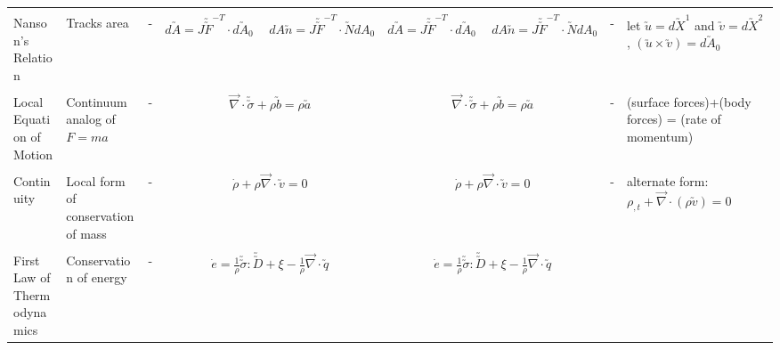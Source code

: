 \documentclass[10pt]{article}
\begin{document}
\begin{center}
\begin{tabular}{l m{3in} c c c c m{5in}}
\\[1ex]
\hline
\\[-1ex]
Nanson's Relation
&%
Tracks area
&%
-
&%
$ d\utilde{A} = J \utilde{\utilde{F}}^{-T}\cdot d\utilde{A}_{0} \hspace{15pt} dA\utilde{n}=J \utilde{\utilde{F}}^{-T}\cdot\utilde{N} dA_{0}$
&%
$ d\utilde{A} = J \utilde{\utilde{F}}^{-T}\cdot d\utilde{A}_{0} \hspace{15pt} dA\utilde{n}=J \utilde{\utilde{F}}^{-T}\cdot\utilde{N} dA_{0}$
&%
-
&%
let $\utilde{u} = d\utilde{X}^{1}$ and $\utilde{v}=d\utilde{X}^{2}$, $(\utilde{u}\times\utilde{v})=d\utilde{A}_{0}$
\\[1ex]
\hline
\\[-1ex]
Local Equation of Motion
&%
Continuum analog of $F=ma$
&%
-
&%
$ \overrightarrow{\nabla}\cdot\utilde{\utilde{\sigma}}+\rho\utilde{b}=\rho\utilde{a}$
&%
$ \overrightarrow{\nabla}\cdot\utilde{\utilde{\sigma}}+\rho\utilde{b}=\rho\utilde{a}$
&%
-
&%
(surface forces)+(body forces) = (rate of momentum)
\\[1ex]
\hline
\\[-1ex]
Continuity
&%
Local form of conservation of mass
&%
-
&%
$ \dot{\rho}+\rho\overrightarrow{\nabla}\cdot\utilde{v}=0 $
&%
$ \dot{\rho}+\rho\overrightarrow{\nabla}\cdot\utilde{v}=0 $
&%
-
&%
alternate form: $\rho_{,t}+\overrightarrow{\nabla}\cdot(\rho\utilde{v})=0$
\\[1ex]
\hline
\\[-1ex]
First Law of Thermodynamics
&%
Conservation of energy
&%
-
&%
$\dot{e}=\frac{1}{\rho}\utilde{\utilde{\sigma}}:\utilde{\utilde{D}}+\xi-\frac{1}{\rho}\overrightarrow{\nabla}\cdot\utilde{q}$
&%
$\dot{e}=\frac{1}{\rho}\utilde{\utilde{\sigma}}:\utilde{\utilde{D}}+\xi-\frac{1}{\rho}\overrightarrow{\nabla}\cdot\utilde{q}$

\end{tabular}
\end{center}
\end{document}
